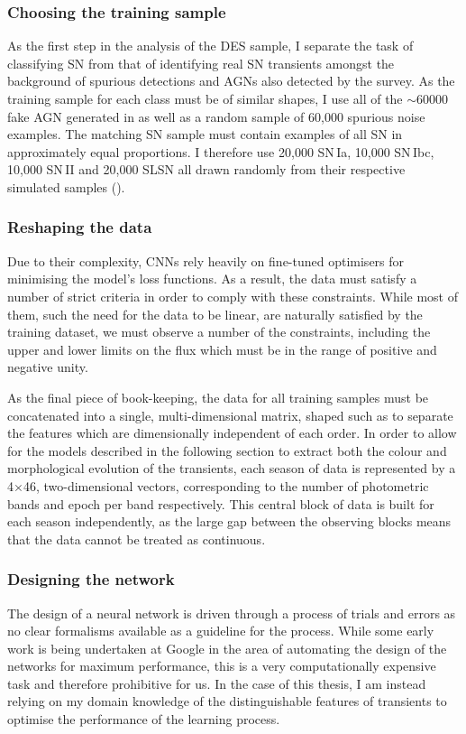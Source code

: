 \subsubsection{Choosing the training sample} \label{sec:AGNNoiseSNSample}
As the first step in the analysis of the DES sample, I separate the task of classifying SN from that of identifying real SN transients amongst the background of spurious detections and AGNs also detected by the survey. As the training sample for each class must be of similar shapes, I use all of the $\sim60000$ fake AGN generated in  as well as a random sample of 60,000 spurious noise examples. The matching SN sample must contain examples of all SN in approximately equal proportions. I therefore use 20,000 SN\,Ia, 10,000 SN\,Ibc, 10,000 SN\,II and 20,000 SLSN all drawn randomly from their respective simulated samples ().

\subsubsection{Reshaping the data}
Due to their complexity, CNNs rely heavily on fine-tuned optimisers for minimising the model's loss functions. As a result, the data must satisfy a number of strict criteria in order to comply with these constraints. While most of them, such the need for the data to be linear, are naturally satisfied by the training dataset, we must observe a number of the constraints, including the upper and lower limits on the flux which must be in the range of positive and negative unity.

As the final piece of book-keeping, the data for all training samples must be concatenated into a single, multi-dimensional matrix, shaped such as to separate the features which are dimensionally independent of each order. In order to allow for the models described in the following section to extract both the colour and morphological evolution of the transients, each season of data is represented by a 4$\times$46, two-dimensional vectors, corresponding to the number of photometric bands and epoch per band respectively. This central block of data is built for each season independently, as the large gap between the observing blocks means that the data cannot be treated as continuous.

\subsubsection{Designing the network} \label{sec:AGNNoiseModel}
The design of a neural network is driven through a process of trials and errors as no clear formalisms available as a guideline for the process. While some early work is being  undertaken at Google in the area of automating the design of the networks for maximum performance, this is a very computationally expensive task and therefore prohibitive for us. In the case of this thesis, I am instead relying on my domain knowledge of the distinguishable features of transients to optimise the performance of the learning process.

